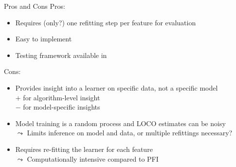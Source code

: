\documentclass[10pt,compress,t,notes=noshow, xcolor=table]{beamer}
\begin{document}
\begin{frame}{Pros and Cons}
  Pros:
  \begin{itemize}
    \item Requires (only?) one refitting step per feature for evaluation
    \item Easy to implement
    \item Testing framework available in 
  \end{itemize}
%
  Cons:
  \begin{itemize}
    \item Provides insight into a learner on specific data, not a specific model\\
    $+$ for algorithm-level insight\\
    $-$ for model-specific insights
    \item Model training is a random process and LOCO estimates can be noisy\\
    $\leadsto$ Limits inference on model and data, or multiple refittings necessary?
    \item Requires re-fitting the learner for each feature\\
    $\leadsto$ Computationally intensive compared to PFI
  \end{itemize}
\end{frame}


\endlecture
\end{document}
